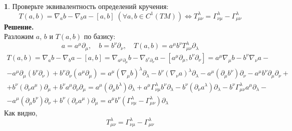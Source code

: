 \documentclass[12pt]{article}
\theoremstyle{definition}
\newtheorem{zad}{}[section]
\begin{document}
\begin{zad}
Проверьте эквивалентность определений кручения:
\begin{equation}
    T(a,b)=\nabla_ab-\nabla_ba-[a,b]\;(\forall a,b\in C^1(TM))\Leftrightarrow T_{\mu\nu}^\lambda=\Gamma_{\nu\mu}^\lambda-\Gamma_{\mu\nu}^\lambda
\end{equation}
\textbf{Решение.}\\
Разложим $a$, $b$ и $T(a,b)$ по базису:
\begin{equation}
    a=a^\mu\partial_\mu,\quad b=b^\nu\partial_\nu, \quad T(a,b)=a^\mu b^\nu T_{\mu\nu}^\lambda\partial_\lambda
\end{equation}
\begin{multline}
    T(a,b)=\nabla_ab-\nabla_ba-[a,b]=\nabla_{a^\mu\partial_\mu}b-\nabla_{b^\nu\partial_\nu}a-[a^\mu\partial_\mu,b^\nu\partial_\nu]=a^\mu\nabla_\mu b-b^\nu\nabla_\nu a-\\-a^\mu\partial_\mu(b^\nu\partial_\nu)+b^\nu\partial_\nu (a^\mu\partial_\mu)=a^\mu(\nabla_\mu b)^\lambda\partial_\lambda-b^\nu(\nabla_\nu a)^\lambda\partial_\lambda-a^\mu(\partial_\mu b^\nu)\partial_\nu-a^\mu b^\nu\partial_\mu\partial_\nu+\\+b^\nu(\partial_\nu a^\mu)\partial_\mu+b^\nu a^\mu\partial_\nu\partial_\mu=a^\mu(\partial_\mu b^\lambda)\partial_\lambda+a^\mu\Gamma^\lambda_{\nu\mu}b^\nu\partial_\lambda-b^\nu(\partial_\nu a^\lambda)\partial_\lambda-b^\nu\Gamma^\lambda_{\mu\nu}a^\mu\partial_\lambda-\\-a^\mu(\partial_\mu b^\nu)\partial_\nu+b^\nu(\partial_\nu a^\mu)\partial_\mu=a^\mu b^\nu(\Gamma^\lambda_{\nu\mu}-\Gamma^\lambda_{\mu\nu})\partial_\lambda
\end{multline}
Как видно,
\begin{equation}
    \boxed{T^\lambda_{\mu\nu}=\Gamma^\lambda_{\nu\mu}-\Gamma^\lambda_{\mu\nu}}
\end{equation}
\end{zad}
\end{document}
